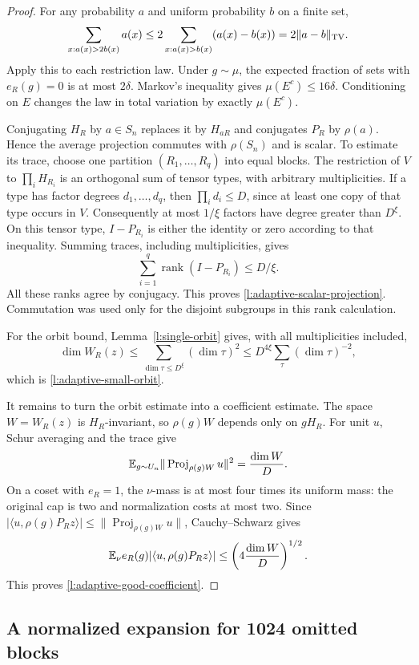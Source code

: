 \begin{proof}
For any probability $a$ and uniform probability $b$ on a finite set,
\[
 \sum_{x:a(x)>2b(x)}a(x)
 \le2\sum_{x:a(x)>b(x)}(a(x)-b(x))
 =2\|a-b\|_{\mathrm{TV}}.
\]
Apply this to each restriction law. Under $g\sim\mu$, the expected
fraction of sets with $e_R(g)=0$ is at most $2\delta$. Markov's
inequality gives $\mu(E^c)\le16\delta$. Conditioning on $E$ changes
the law in total variation by exactly $\mu(E^c)$.

Conjugating $H_R$ by $a\in S_n$ replaces it by $H_{aR}$ and conjugates
$P_R$ by $\rho(a)$. Hence the average projection commutes with
$\rho(S_n)$ and is scalar. To estimate its trace, choose one partition
$(R_1,\ldots,R_q)$ into equal blocks. The restriction of $V$ to
$\prod_iH_{R_i}$ is an orthogonal sum of tensor types, with arbitrary
multiplicities. If a type has factor degrees $d_1,\ldots,d_q$, then
$\prod_i d_i\le D$, since at least one copy of that type occurs in $V$.
Consequently at most $1/\xi$ factors have degree greater than $D^\xi$.
On this tensor type, $I-P_{R_i}$ is either the identity or zero according
to that inequality. Summing traces, including multiplicities, gives
\[
 \sum_{i=1}^q\operatorname{rank}(I-P_{R_i})\le D/\xi.
\]
All these ranks agree by conjugacy. This proves
\eqref{l:adaptive-scalar-projection}. Commutation was used only for
the disjoint subgroups in this rank calculation.

For the orbit bound, Lemma~\ref{l:single-orbit} gives, with all
multiplicities included,
\[
 \dim W_R(z)\le\sum_{\dim\tau\le D^\xi}(\dim\tau)^2
 \le D^{4\xi}\sum_\tau(\dim\tau)^{-2},
\]
which is \eqref{l:adaptive-small-orbit}.

It remains to turn the orbit estimate into a coefficient estimate.
The space $W=W_R(z)$ is $H_R$-invariant, so $\rho(g)W$ depends only
on $gH_R$. For unit $u$, Schur averaging and the trace give
\[
 \mathbb E_{g\sim U_n}\|\operatorname{Proj}_{\rho(g)W}u\|^2
 =\frac{\dim W}{D}.
\]
On a coset with $e_R=1$, the $\nu$-mass is at most four times its
uniform mass: the original cap is two and normalization costs at most
two. Since
$|\langle u,\rho(g)P_Rz\rangle|\le
\|\operatorname{Proj}_{\rho(g)W}u\|$, Cauchy--Schwarz gives
\[
 \mathbb E_\nu e_R(g)|\langle u,\rho(g)P_Rz\rangle|
 \le\left(4\frac{\dim W}{D}\right)^{1/2}.
\]
This proves \eqref{l:adaptive-good-coefficient}.
\end{proof}

\subsection{A normalized expansion for 1024 omitted blocks}

